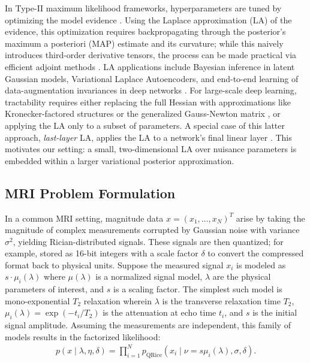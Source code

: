 \documentclass{article}
\begin{document}
In Type-II maximum likelihood frameworks, hyperparameters are tuned by optimizing the model evidence \citep{mackay_bayesian_1992}.
Using the Laplace approximation (LA) of the evidence, this optimization requires backpropagating through the posterior's maximum a posteriori (MAP) estimate and its curvature; while this naively introduces third-order derivative tensors, the process can be made practical via efficient adjoint methods \citep{margossian_hamiltonian_2020}.
LA applications include Bayesian inference in latent Gaussian models, Variational Laplace Autoencoders, and end-to-end learning of data-augmentation invariances in deep networks \citep{margossian_hamiltonian_2020, park_variational_2019, immer_invariance_2022}.
For large-scale deep learning, tractability requires either replacing the full Hessian with approximations like Kronecker-factored structures or the generalized Gauss-Newton matrix \citep{ritter_scalable_2018, immer_improving_2021}, or applying the LA only to a subset of parameters.
A special case of this latter approach, \textit{last-layer} LA, applies the LA to a network's final linear layer \citep{kristiadi_being_2020, daxberger_laplace_2021}.
This motivates our setting: a small, two-dimensional LA over nuisance parameters is embedded within a larger variational posterior approximation.

\subsection{MRI Problem Formulation}

In a common MRI setting, magnitude data $x = (x_1, \dots, x_N)^T$ arise by taking the magnitude of complex measurements corrupted by Gaussian noise with variance $\sigma^2$, yielding Rician-distributed signals.
These signals are then quantized;
for example, stored as 16-bit integers with a scale factor $\delta$ to convert the compressed format back to physical units.
Suppose the measured signal $x_i$ is modeled as $s \cdot \mu_i(\lambda)$ where $\mu(\lambda)$ is a normalized signal model, $\lambda$ are the physical parameters of interest, and $s$ is a scaling factor.
The simplest such model is mono-exponential $T_2$ relaxation wherein $\lambda$ is the transverse relaxation time $T_2$, $\mu_i(\lambda) = \exp(-t_i/T_2)$ is the attenuation at echo time $t_i$, and $s$ is the initial signal amplitude.
Assuming the measurements are independent, this family of models results in the factorized likelihood:
%
\begin{align}\label{eq:likelihood}
  p(x \mid \lambda, \eta, \delta) = \prod_{i=1}^N p_{\mathrm{QRice}}(x_i \mid \nu = s \mu_i(\lambda), \sigma, \delta).
\end{align}
\end{document}
